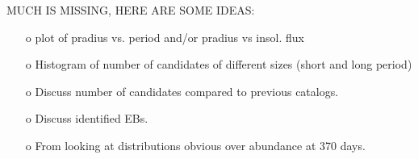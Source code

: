 MUCH IS MISSING, HERE ARE SOME IDEAS:
\begin{itemize}
    \item [o] plot of pradius vs. period and/or pradius vs insol. flux
    \item [o] Histogram of number of candidates of different sizes (short and long period)
    \item [o] Discuss number of candidates compared to previous catalogs.
    \item [o] Discuss identified EBs.
    \item [o] From looking at distributions obvious over abundance at 370 days.
\end{itemize}